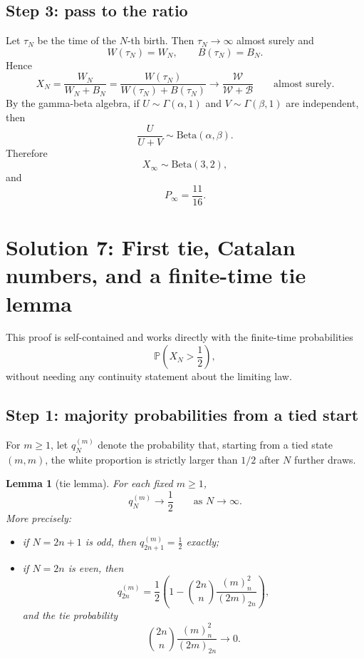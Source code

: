 \documentclass[12pt]{article}
\newtheorem{lemma}{Lemma}
\begin{document}
\subsection*{Step 3: pass to the ratio}
Let $\tau_N$ be the time of the $N$-th birth. Then $\tau_N\to\infty$ almost surely and
\[
W(\tau_N)=W_N,\qquad B(\tau_N)=B_N.
\]
Hence
\[
X_N
=
\frac{W_N}{W_N+B_N}
=
\frac{W(\tau_N)}{W(\tau_N)+B(\tau_N)}
\longrightarrow
\frac{\mathcal{W}}{\mathcal{W}+\mathcal{B}}
\qquad\text{almost surely.}
\]
By the gamma-beta algebra, if $U\sim \Gamma(\alpha,1)$ and $V\sim \Gamma(\beta,1)$ are independent, then
\[
\frac{U}{U+V}\sim \mathrm{Beta}(\alpha,\beta).
\]
Therefore
\[
X_\infty\sim \mathrm{Beta}(3,2),
\]
and
\[
P_\infty=\frac{11}{16}.
\]

\section{Solution 7: First tie, Catalan numbers, and a finite-time tie lemma}

This proof is self-contained and works directly with the finite-time probabilities
\[
\mathbb{P}\!\left(X_N>\frac12\right),
\]
without needing any continuity statement about the limiting law.

\subsection*{Step 1: majority probabilities from a tied start}

For $m\ge 1$, let $q_N^{(m)}$ denote the probability that, starting from a tied state $(m,m)$, the white proportion is strictly larger than $1/2$ after $N$ further draws.

\begin{lemma}[tie lemma]
For each fixed $m\ge 1$,
\[
q_N^{(m)}\longrightarrow \frac12
\qquad\text{as }N\to\infty.
\]
More precisely:
\begin{itemize}
    \item if $N=2n+1$ is odd, then $q_{2n+1}^{(m)}=\frac12$ exactly;
    \item if $N=2n$ is even, then
    \[
    q_{2n}^{(m)}
    =
    \frac12\left(1-\binom{2n}{n}\frac{(m)_n^2}{(2m)_{2n}}\right),
    \]
    and the tie probability
    \[
    \binom{2n}{n}\frac{(m)_n^2}{(2m)_{2n}}
    \longrightarrow 0.
    \]
\end{itemize}
\end{lemma}
\end{document}
